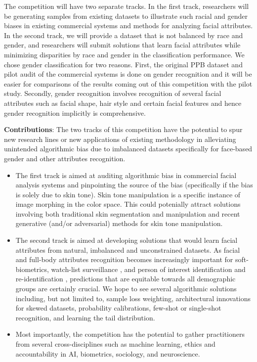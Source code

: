\documentclass[11pt, oneside]{article}
\makeatletter
\let\@internalcite\cite
\def\cite{\def\citeauthoryear##1##2{##1, ##2}\@internalcite}
\makeatother
\begin{document}
The competition will have two separate tracks. In the first track, researchers
will be generating samples from existing datasets to illustrate such racial and
gender biases in existing commercial systems and
methods for analyzing facial attributes. In the second track, we will provide a dataset that is not balanced by race and
gender, and researchers will submit solutions that learn facial attributes
while minimizing disparities by race and gender in the classification performance.
We chose gender classification for two reasons. First, the original PPB dataset
and pilot audit of the commercial systems is done on gender recognition and it
will be easier for comparisons of the results coming out of this competition
with the pilot study. Secondly, gender recognition involves recognition of
several facial attributes such as facial shape, hair style and certain facial
features and hence gender recognition implicitly is comprehensive.

{\bf Contributions}: The two tracks of this competition have the potential to 
spur new research lines or new applications of existing methodology in 
alleviating unintended algorithmic bias due to imbalanced datasets specifically 
for face-based gender and other attributes recognition. 
\begin{itemize}
	\item The first track is aimed at auditing algorithmic bias in commercial 
	facial analysis systems and pinpointing the source of the bias 
	(specifically if the bias is solely due to skin tone). Skin tone 
	manipulation is a specific instance of image morphing in the color space. 
	This could potenially attract solutions involving both traditional skin 
	segmentation and manipulation \cite{martinson2013identifying} and recent 
	generative (and/or adversarial) 
	methods for skin tone manipulation.
	\item The second track is aimed at developing solutions that would learn 
	facial attributes from natural, imbalanced and unconstrained datasets. As 
	facial and full-body attributes recognition \cite{bekele2017multi} becomes 
	increasingly important
	for soft-biometrics, watch-list surveillance  \cite{kamgar2011toward}, and
	person of interest identification and re-identification 
	\cite{best2014unconstrained}, predictions that are equitable towards all 
	demographic groups are certainly crucial. We hope to see several 
	algorithmic solutions including, but not limited to, sample loss weighting, 
	architectural innovations for skewed datasets, probability calibrations, 
	few-shot or single-shot recognition, and learning the tail distribution.
	\item Most importantly, the competition has the potential to gather 
	practitioners from several cross-disciplines such as machine learning, 
	ethics and accountability in AI, biometrics, sociology, and neuroscience.
\end{itemize}
\end{document}
